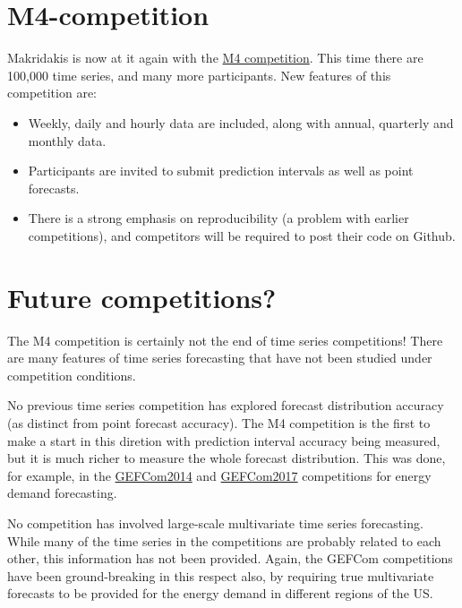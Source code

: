 \documentclass[11pt,a4paper,]{article}
\providecommand{\tightlist}{%
  \setlength{\itemsep}{0pt}\setlength{\parskip}{0pt}}
\begin{document}
\hypertarget{m4-competition}{%
\section{M4-competition}\label{m4-competition}}

Makridakis is now at it again with the \href{https://www.m4.unic.ac.cy/}{M4 competition}. This time there are 100,000 time series, and many more participants. New features of this competition are:

\begin{itemize}
\tightlist
\item
  Weekly, daily and hourly data are included, along with annual, quarterly and monthly data.
\item
  Participants are invited to submit prediction intervals as well as point forecasts.
\item
  There is a strong emphasis on reproducibility (a problem with earlier competitions), and competitors will be required to post their code on Github.
\end{itemize}

\hypertarget{future-competitions}{%
\section{Future competitions?}\label{future-competitions}}

The M4 competition is certainly not the end of time series competitions! There are many features of time series forecasting that have not been studied under competition conditions.

No previous time series competition has explored forecast distribution accuracy (as distinct from point forecast accuracy). The M4 competition is the first to make a start in this diretion with prediction interval accuracy being measured, but it is much richer to measure the whole forecast distribution. This was done, for example, in the \href{http://www.drhongtao.com/gefcom/2014}{GEFCom2014} and \href{http://www.drhongtao.com/gefcom/2017}{GEFCom2017} competitions for energy demand forecasting.

No competition has involved large-scale multivariate time series forecasting. While many of the time series in the competitions are probably related to each other, this information has not been provided. Again, the GEFCom competitions have been ground-breaking in this respect also, by requiring true multivariate forecasts to be provided for the energy demand in different regions of the US.
\end{document}
